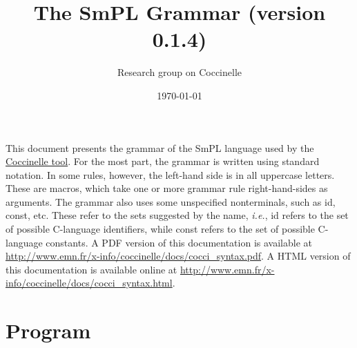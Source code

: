 \documentclass{article}
\title{The SmPL Grammar (version 0.1.4)}
\author{Research group on Coccinelle}
\date{\today}
\begin{document}
\maketitle



This document presents the grammar of the SmPL language used by the
\href{http://www.emn.fr/x-info/coccinelle}{Coccinelle tool}.  For the most
part, the grammar is written using standard notation.  In some rules,
however, the left-hand side is in all uppercase letters.  These are
macros, which take one or more grammar rule right-hand-sides as
arguments.  The grammar also uses some unspecified nonterminals, such
as {\sf id}, {\sf const}, etc.  These refer to the sets suggested by
the name, {\em i.e.}, {\sf id} refers to the set of possible
C-language identifiers, while {\sf const} refers to the set of
possible C-language constants.  \ifhevea A PDF version of this
documentation is available at
\url{http://www.emn.fr/x-info/coccinelle/docs/cocci_syntax.pdf}.\else
A HTML version of this documentation is available online at
\url{http://www.emn.fr/x-info/coccinelle/docs/cocci_syntax.html}. \fi


\section{Program}

\begin{grammar}



\end{grammar}
\end{document}
